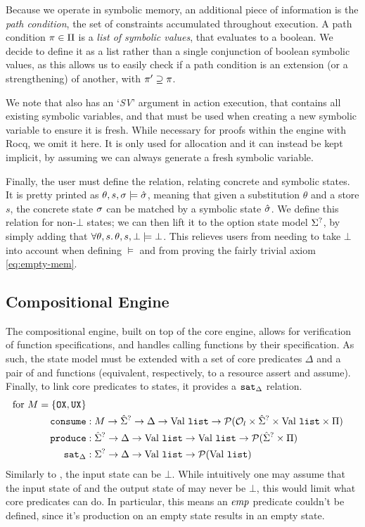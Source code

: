 Because we operate in symbolic memory, an additional piece of information is the \emph{path condition}, the set of constraints accumulated throughout execution. A path condition $\pi\in\Pi$ is a \emph{list of symbolic values}, that evaluates to a boolean. We decide to define it as a list rather than a single conjunction of boolean symbolic values, as this allows us to easily check if a path condition is an extension (or a strengthening) of another, with $\pi'\supseteq\pi$.

We note that \cite{cse2} also has an `\textit{SV}' argument in action execution, that contains all existing symbolic variables, and that must be used when creating a new symbolic variable to ensure it is fresh. While necessary for proofs within the engine with Rocq, we omit it here. It is only used for allocation and it can instead be kept implicit, by assuming we can always generate a fresh symbolic variable.

Finally, the user must define the  relation, relating concrete and symbolic states. It is pretty printed as $\theta,s,\sigma\models \hat{\sigma}$, meaning that given a substitution $\theta$ and a store $s$, the concrete state $\sigma$ can be matched by a symbolic state $\hat{\sigma}$. We define this relation for non-$\bot$ states; we can then lift it to the option state model $\Sigma^?$, by simply adding that $\forall \theta, s\ldotp \theta,s,\bot \models \bot$. This relieves users from needing to take $\bot$ into account when defining $\models$ and from proving the fairly trivial axiom \ref{eq:empty-mem}.

\subsection{Compositional Engine}

The compositional engine, built on top of the core engine, allows for verification of function specifications, and handles calling functions by their specification. As such, the state model must be extended with a set of core predicates $\Delta$ and a pair of \consume{} and \produce{} functions (equivalent, respectively, to a resource assert and assume). Finally, to link core predicates to states, it provides a $\texttt{sat}_\Delta$ relation.
\begin{align*}
	\text{for }M=\{\texttt{OX}, \texttt{UX}\}\\
	\texttt{consume} &: M\rightarrow \hat{\Sigma}^? \rightarrow \Delta \rightarrow \text{Val}~\texttt{list} \rightarrow {\cal P}({\cal O}_l \times \hat{\Sigma}^? \times \text{Val}~\texttt{list} \times \Pi) \\
	\texttt{produce} &: \hat{\Sigma}^? \rightarrow \Delta \rightarrow \text{Val}~\texttt{list} \rightarrow \text{Val}~\texttt{list} \rightarrow {\cal P}(\hat{\Sigma}^? \times \Pi)\\
	\texttt{sat}_\Delta &:\Sigma^? \rightarrow \Delta \rightarrow \text{Val}~\texttt{list} \rightarrow {\cal P}(\text{Val}~\texttt{list})
\end{align*}
Similarly to \execac, the input state can be $\bot$. While intuitively one may assume that the input state of \consume{} and the output state of \produce{} may never be $\bot$, this would limit what core predicates can do. In particular, this means an $\textit{emp}$ predicate couldn't be defined, since it's production on an empty state results in an empty state.

